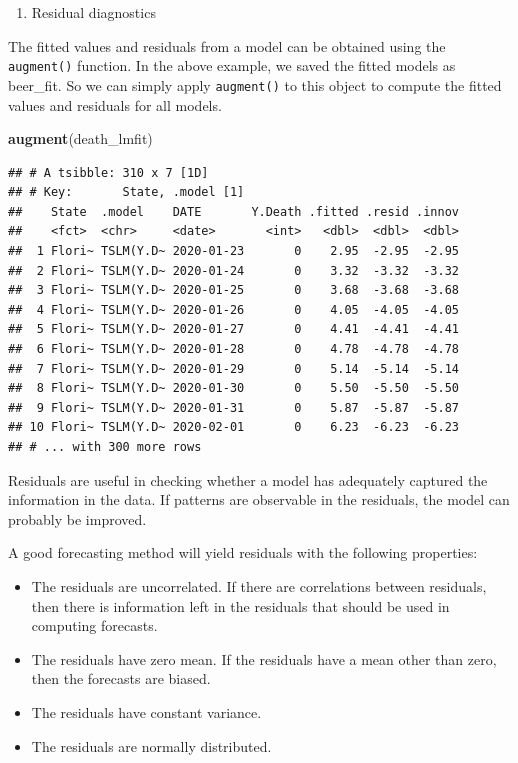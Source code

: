 \documentclass[]{book}
\newenvironment{Shaded}{\begin{snugshade}}{\end{snugshade}}
\newcommand{\KeywordTok}[1]{\textcolor[rgb]{0.13,0.29,0.53}{\textbf{#1}}}
\newcommand{\NormalTok}[1]{#1}
\providecommand{\tightlist}{%
  \setlength{\itemsep}{0pt}\setlength{\parskip}{0pt}}
\begin{document}
\begin{enumerate}
\def\labelenumi{\arabic{enumi}.}
\setcounter{enumi}{2}
\tightlist
\item
  Residual diagnostics
\end{enumerate}

The fitted values and residuals from a model can be obtained using the
\texttt{augment()} function. In the above example, we saved the fitted
models as beer\_fit. So we can simply apply \texttt{augment()} to this
object to compute the fitted values and residuals for all models.

\begin{Shaded}
\begin{Highlighting}[]
\KeywordTok{augment}\NormalTok{(death_lmfit)}
\end{Highlighting}
\end{Shaded}

\begin{verbatim}
## # A tsibble: 310 x 7 [1D]
## # Key:       State, .model [1]
##    State  .model    DATE       Y.Death .fitted .resid .innov
##    <fct>  <chr>     <date>       <int>   <dbl>  <dbl>  <dbl>
##  1 Flori~ TSLM(Y.D~ 2020-01-23       0    2.95  -2.95  -2.95
##  2 Flori~ TSLM(Y.D~ 2020-01-24       0    3.32  -3.32  -3.32
##  3 Flori~ TSLM(Y.D~ 2020-01-25       0    3.68  -3.68  -3.68
##  4 Flori~ TSLM(Y.D~ 2020-01-26       0    4.05  -4.05  -4.05
##  5 Flori~ TSLM(Y.D~ 2020-01-27       0    4.41  -4.41  -4.41
##  6 Flori~ TSLM(Y.D~ 2020-01-28       0    4.78  -4.78  -4.78
##  7 Flori~ TSLM(Y.D~ 2020-01-29       0    5.14  -5.14  -5.14
##  8 Flori~ TSLM(Y.D~ 2020-01-30       0    5.50  -5.50  -5.50
##  9 Flori~ TSLM(Y.D~ 2020-01-31       0    5.87  -5.87  -5.87
## 10 Flori~ TSLM(Y.D~ 2020-02-01       0    6.23  -6.23  -6.23
## # ... with 300 more rows
\end{verbatim}

Residuals are useful in checking whether a model has adequately captured
the information in the data. If patterns are observable in the
residuals, the model can probably be improved.

A good forecasting method will yield residuals with the following
properties:

\begin{itemize}
\tightlist
\item
  The residuals are uncorrelated. If there are correlations between
  residuals, then there is information left in the residuals that should
  be used in computing forecasts.
\item
  The residuals have zero mean. If the residuals have a mean other than
  zero, then the forecasts are biased.
\item
  The residuals have constant variance.
\item
  The residuals are normally distributed.
\end{itemize}
\end{document}
